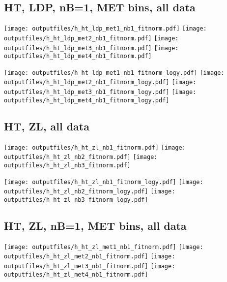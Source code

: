 \documentclass[11pt]{article}
\begin{document}
     \subsection{ HT, LDP, nB=1, MET bins, all data}

    \noindent
     \texttt{[image: outputfiles/h\_ht\_ldp\_met1\_nb1\_fitnorm.pdf]}
     \texttt{[image: outputfiles/h\_ht\_ldp\_met2\_nb1\_fitnorm.pdf]}
     \texttt{[image: outputfiles/h\_ht\_ldp\_met3\_nb1\_fitnorm.pdf]}
     \texttt{[image: outputfiles/h\_ht\_ldp\_met4\_nb1\_fitnorm.pdf]}

    \noindent
     \texttt{[image: outputfiles/h\_ht\_ldp\_met1\_nb1\_fitnorm\_logy.pdf]}
     \texttt{[image: outputfiles/h\_ht\_ldp\_met2\_nb1\_fitnorm\_logy.pdf]}
     \texttt{[image: outputfiles/h\_ht\_ldp\_met3\_nb1\_fitnorm\_logy.pdf]}
     \texttt{[image: outputfiles/h\_ht\_ldp\_met4\_nb1\_fitnorm\_logy.pdf]}

   \clearpage

     \subsection{ HT, ZL, all data}

    \noindent
     \texttt{[image: outputfiles/h\_ht\_zl\_nb1\_fitnorm.pdf]}
     \texttt{[image: outputfiles/h\_ht\_zl\_nb2\_fitnorm.pdf]}
     \texttt{[image: outputfiles/h\_ht\_zl\_nb3\_fitnorm.pdf]}

    \noindent
     \texttt{[image: outputfiles/h\_ht\_zl\_nb1\_fitnorm\_logy.pdf]}
     \texttt{[image: outputfiles/h\_ht\_zl\_nb2\_fitnorm\_logy.pdf]}
     \texttt{[image: outputfiles/h\_ht\_zl\_nb3\_fitnorm\_logy.pdf]}


   \clearpage

     \subsection{ HT, ZL, nB=1, MET bins, all data}

    \noindent
     \texttt{[image: outputfiles/h\_ht\_zl\_met1\_nb1\_fitnorm.pdf]}
     \texttt{[image: outputfiles/h\_ht\_zl\_met2\_nb1\_fitnorm.pdf]}
     \texttt{[image: outputfiles/h\_ht\_zl\_met3\_nb1\_fitnorm.pdf]}
     \texttt{[image: outputfiles/h\_ht\_zl\_met4\_nb1\_fitnorm.pdf]}
\end{document}
